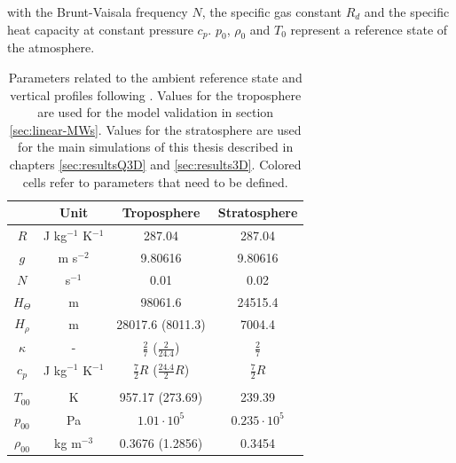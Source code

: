 with the Brunt-Vaisala frequency $N$, the specific gas constant $R_d$ and the specific heat capacity at constant pressure $c_p$. $p_0$, $\rho_0$ and $T_0$ represent a reference state of the atmosphere.

\begin{table}[ht]
\centering
\caption{Parameters related to the ambient reference state and vertical profiles following \textcite[]{bacmeister_breakdown_1989}. Values for the troposphere are used for the model validation in section \ref{sec:linear-MWs}. Values for the stratosphere are used for the main simulations of this thesis described in chapters \ref{sec:resultsQ3D} and \ref{sec:results3D}. Colored cells refer to parameters that need to be defined.}

\begin{tabular}{@{}cccc@{}}
\toprule
 & Unit & Troposphere & Stratosphere \\ \midrule[1pt]

$R$ & J kg$^{-1}$ K$^{-1}$ &   \cellcolor{LightCyan} 287.04 &   \cellcolor{LightCyan} 287.04 \\
$g$ & m s$^{-2}$ & \cellcolor{LightCyan} 9.80616 & \cellcolor{LightCyan} 9.80616 \\
$N$ & s$^{-1}$ & \cellcolor{LightCyan} 0.01 & \cellcolor{LightCyan} 0.02 \\
$H_{\Theta}$ & m & 98061.6 & 24515.4  \\
$H_{\rho}$ & m & 28017.6 (8011.3)  & 7004.4 \\
$\kappa$ & - & $ \frac{2}{7}$ ($\frac{2}{24.4}$) & $ \frac{2}{7}$ \\
$c_p$ & J kg$^{-1}$ K$^{-1}$ & $\frac{7}{2} R$ ($\frac{24.4}{2} R$) & $\frac{7}{2} R$ \\

& & & \\
$T_{00}$ & K & \cellcolor{LightCyan} 957.17 (273.69) & 239.39 \\
$p_{00}$ & Pa &  \cellcolor{LightCyan} $1.01 \cdot 10^5$ & \cellcolor{LightCyan} $0.235 \cdot 10^5$ \\
$\rho_{00}$ & kg m$^{-3}$ & 0.3676 (1.2856) & 0.3454 \\


\bottomrule
\end{tabular}
\label{tab:ambientProfiles}
\end{table}


